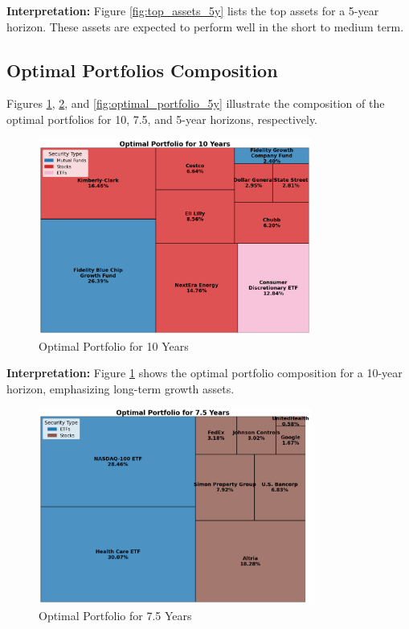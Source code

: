 \textbf{Interpretation:} Figure \ref{fig:top_assets_5y} lists the top assets for a 5-year horizon. These assets are expected to perform well in the short to medium term.









\subsection{Optimal Portfolios Composition}
Figures \ref{fig:optimal_portfolio_10y}, \ref{fig:optimal_portfolio_7_5y}, and \ref{fig:optimal_portfolio_5y} illustrate the composition of the optimal portfolios for 10, 7.5, and 5-year horizons, respectively.

\begin{figure}[!htbp]
    \centering
    \includegraphics[width=0.8\textwidth]{../Figures/optimal_portfolio_10_years.png}
    \caption{Optimal Portfolio for 10 Years}
    \label{fig:optimal_portfolio_10y}
\end{figure}

\textbf{Interpretation:} Figure \ref{fig:optimal_portfolio_10y} shows the optimal portfolio composition for a 10-year horizon, emphasizing long-term growth assets.

\begin{figure}[!htbp]
    \centering
    \includegraphics[width=0.8\textwidth]{../Figures/optimal_portfolio_7_5_years.png}
    \caption{Optimal Portfolio for 7.5 Years}
    \label{fig:optimal_portfolio_7_5y}
\end{figure}

